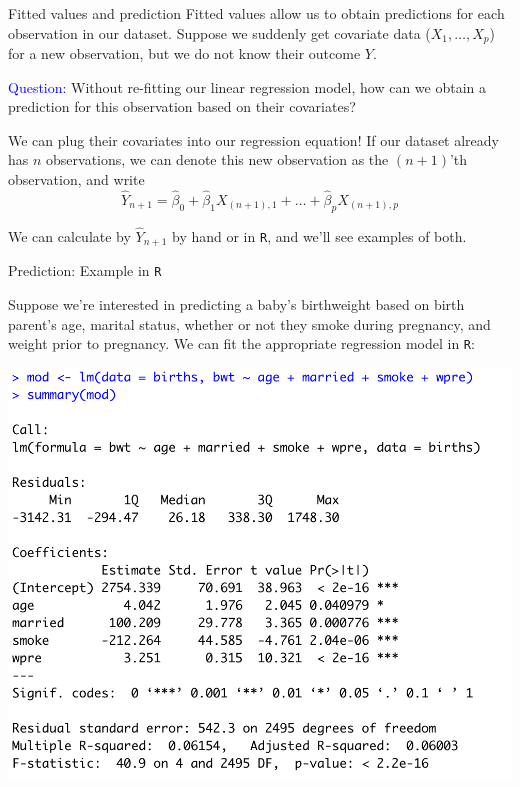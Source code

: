 \documentclass[10pt,t]{beamer}
\begin{document}
\begin{frame}{Fitted values and prediction}
Fitted values allow us to obtain predictions for each observation in our dataset. Suppose we suddenly get covariate data ($X_1, \dots, X_p$) for a new observation, but we do not know their outcome $Y$. 

\vspace{0.3cm} 

\textcolor{blue}{Question:} Without re-fitting our linear regression model, how can we obtain a prediction for this observation based on their covariates? \pause

\vspace{0.3cm}

We can plug their covariates into our regression equation! If our dataset already has $n$ observations, we can denote this new observation as the $(n + 1)$'th observation, and write
$$
\hat{Y}_{n + 1} = \hat{\beta}_0 + \hat{\beta}_1 X_{(n + 1), 1} + \dots + \hat{\beta}_p X_{(n + 1), p}
$$

We can calculate by $\hat{Y}_{n + 1}$ by hand or in \texttt{R}, and we'll see examples of both.

\end{frame}

\begin{frame}{Prediction: Example in \texttt{R}}

Suppose we're interested in predicting a baby's birthweight based on birth parent's age, marital status, whether or not they smoke during pregnancy, and weight prior to pregnancy. We can fit the appropriate regression model in \texttt{R}:

\vspace{0.2cm}

\centering \includegraphics[scale=0.35]{predict_reg.png}
\end{frame}
\end{document}
